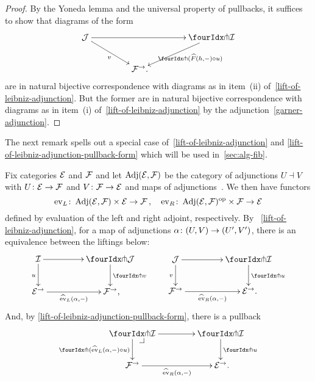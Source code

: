 \documentclass[reqno,10pt,a4paper,oneside,draft]{amsart}
\begin{document}
{{\begin{proof}
By the Yoneda lemma and the universal property of pullbacks, it suffices to show that diagrams of the form
\[
\begin{gathered}
\xymatrix@C+2em{
  \cal{J} \ar[dr]_v \ar[rr] & & \liftr{\cal{I}}  \ar[dl]^{\liftr{(\widehat{F}(h, \arghole) \cc u)}} \\
   & \cal{F}^\to  \rlap{.} & }
\end{gathered}
\]
are in natural bijective correspondence with diagrams as in item~(ii) of~\cref{lift-of-leibniz-adjunction}.
But the former are in natural bijective correspondence with diagrams as in item~(i) of~\cref{lift-of-leibniz-adjunction} by the adjunction~\eqref{garner-adjunction}.
\end{proof}

The next remark spells out a special case of~\cref{lift-of-leibniz-adjunction} and \cref{lift-of-leibniz-adjunction-pullback-form} which will be used in~\cref{sec:alg-fib}.


\begin{remark} \label{pitchfork-leibniz-most-general-example}
Fix categories $\mathcal{E}$ and $\mathcal{F}$ and let $\operatorname{Adj}(\mathcal{E}, \mathcal{F})$ be the category of adjunctions $U \dashv V$ with $U \colon \mathcal{E} \to \mathcal{F}$ and $V \colon \mathcal{F} \to \mathcal{E}$ and maps of adjunctions~\cite[Chapter IV,\S 7]{maclane-cawm}. We then have 
functors
\[
\operatorname{ev}_L \colon \operatorname{Adj}(\mathcal{E}, \mathcal{F}) \times \mathcal{E} \to \mathcal{F} \, , \quad
\operatorname{ev}_R \colon \operatorname{Adj}(\mathcal{E}, \mathcal{F})^{\operatorname{op}} \times \mathcal{F} \to \mathcal{E}
\]
defined by evaluation of the left and right adjoint, respectively. By ~\cref{lift-of-leibniz-adjunction}, for a map
of adjunctions $\alpha \colon (U, V) \to (U',V')$, there is an equivalence between the liftings below:
\[
\begin{gathered}
\xymatrix@C=1.5cm{
  \cal{I}
  \ar[r]
  \ar[d]_{u}
&
  \liftl{\cal{J}}
  \ar[d]^{\liftl{v}}
\\
  \catE^\to
  \ar[r]_-{\hateval_L(\alpha, \arghole)}
&
  \cal{F}^\to
\rlap{,}} 
\end{gathered}
 \qquad
\begin{gathered}
\xymatrix@C+2em{
  \cal{J}
  \ar[d]_{v}
  \ar[r]
&
  \liftr{\cal{I}}
  \ar[d]^{\liftr{u}}
\\
  \cal{F}^\to
  \ar[r]_-{\hateval_R(\alpha, \arghole)}
&
  \catE^\to
\rlap{.}}
\end{gathered}
\]
And, by \cref{lift-of-leibniz-adjunction-pullback-form}, there is a pullback 
\[
\xymatrix@C=1.5cm{
  \liftr{\cal{I}}
  \ar[r]
  \ar[d]_{\liftr{(\hateval_L(\alpha, \arghole) \cc u)}}
  \pullback{dr}
&
  \liftr{\cal{I}}
  \ar[d]^{\liftr{u}}
\\
  \cal{F}^\to
  \ar[r]_-{\hateval_R(\alpha, \arghole)}
&
  \cal{E}^\to
\rlap{.}}
\]
\end{remark} 

}}
\end{document}
